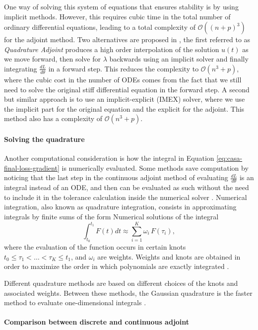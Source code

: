One way of solving this system of equations that ensures stability is by using implicit methods. 
However, this requires cubic time in the total number of ordinary differential equations, leading to a total complexity of $\mathcal O((n+p)^3)$ for the adjoint method.
Two alternatives are proposed in \cite{kim_stiff_2021}, the first referred to as \textit{Quadrature Adjoint} produces a high order interpolation of the solution $u(t)$ as we move forward, then solve for $\lambda$ backwards using an implicit solver and finally integrating $\frac{dL}{d\theta}$ in a forward step.
This reduces the complexity to $\mathcal O (n^3 + p)$, where the cubic cost in the number of ODEs comes from the fact that we still need to solve the original stiff differential equation in the forward step. 
A second but similar approach is to use an implicit-explicit (IMEX) solver, where we use the implicit part for the original equation and the explicit for the adjoint. 
This method also has a complexity of $\mathcal O (n^3 + p)$.

\paragraph{Solving the quadrature}

Another computational consideration is how the integral in Equation \eqref{eq:casa-final-loss-gradient} is numerically evaluated. 
Some methods save computation by noticing that the last step in the continuous adjoint method of evaluating $\frac{dL}{d\theta}$ is an integral instead of an ODE, and then can be evaluated as such without the need to include it in the tolerance calculation inside the numerical solver \cite{that-is-not-an-ode}.
Numerical integration, also known as quadrature integration, consists in approximating integrals by finite sums of the form
Numerical solutions of the integral 
\begin{equation}
    \int_{t_0}^{t_1} 
    F(t) dt
    \approx
    \sum_{i=1}^K \omega_i \, F(\tau_i),
\end{equation}
where the evaluation of the function occurs in certain knots $t_0 \leq \tau_1 < \ldots < \tau_K \leq t_1$, and $\omega_i$ are weights. 
Weights and knots are obtained in order to maximize the order in which polynomials are exactly integrated \cite{stoer2002-numerical}. 

Different quadrature methods are based on different choices of the knots and associated weights.
Between these methods, the Gaussian quadrature is the faster method to evaluate one-dimensional integrals \cite{Norcliffe_gaussquadrature_2023}.

\paragraph{Comparison between discrete and continuous adjoint}